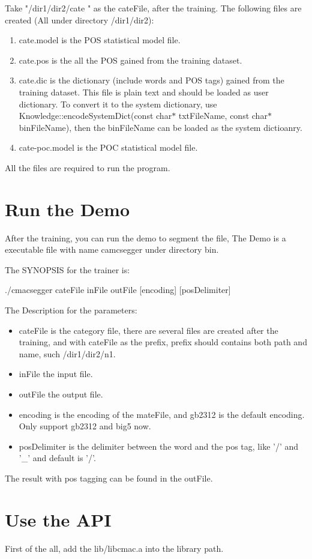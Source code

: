 Take "/dir1/dir2/cate " as the cateFile, after the training. The following files are created (All under directory /dir1/dir2): \begin{enumerate}
\item cate.model is the POS statistical model file. \item cate.pos is the all the POS gained from the training dataset. \item cate.dic is the dictionary (include words and POS tags) gained from the training dataset. This file is plain text and should be loaded as user dictionary. To convert it to the system dictionary, use Knowledge::encodeSystemDict(const char$\ast$ txtFileName, const char$\ast$ binFileName), then the binFileName can be loaded as the system dictioanry. \item cate-poc.model is the POC statistical model file. \end{enumerate}


All the files are required to run the program.\par
\section{Run the Demo}\label{index_rundemo}
After the training, you can run the demo to segment the file, The Demo is a executable file with name camcsegger under directory bin.

The SYNOPSIS for the trainer is: \par
 ./cmacsegger cateFile inFile outFile [encoding] [posDelimiter] \par


\par
The Description for the parameters: \begin{itemize}
\item cateFile is the category file, there are several files are created after the training, and with cateFile as the prefix, prefix should contains both path and name, such /dir1/dir2/n1. \item inFile the input file. \item outFile the output file. \item encoding is the encoding of the mateFile, and gb2312 is the default encoding. Only support gb2312 and big5 now. \item posDelimiter is the delimiter between the word and the pos tag, like '/' and '\_\-' and default is '/'. \end{itemize}


The result with pos tagging can be found in the outFile.\section{Use the API}\label{index_useapi}
First of the all, add the lib/libcmac.a into the library path.


